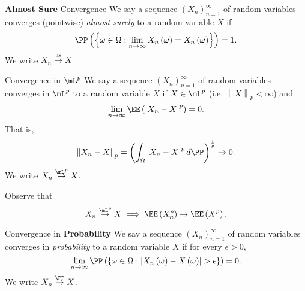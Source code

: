 \documentclass[stat901]{subfiles}
\begin{document}
    \begin{definition}{\textbf{Almost Sure} Convergence}
        We say a sequence $\left( X_{n} \right)^{\infty}_{n=1}$ of random variables converges (pointwise) \emph{almost surely} to a random variable $X$ if
        \begin{equation*}
            \PP\left( \left\lbrace \omega\in\Omega : \lim_{n\to\infty} X_n\left( \omega \right) = X_n\left( \omega \right) \right\rbrace \right) = 1.
        \end{equation*}
        We write $X_n\overset{\text{as}}{\to} X$.
    \end{definition}

    \begin{definition}{Convergence in $\mL^p$}
        We say a sequence $\left( X_{n} \right)^{\infty}_{n=1}$ of random variables converges in $\mL^p$ to a random variable $X$ if $X\in\mL^p$ (i.e. $\left\lVert X\right\rVert_p < \infty$) and
        \begin{equation*}
            \lim_{n\to\infty}\EE\left( \left| X_n-X \right|^p \right) = 0.
        \end{equation*}
        That is,
        \begin{equation*}
            \left\lVert X_n-X\right\rVert_p = \left(\int_{\Omega}\left| X_n-X \right|^pd\PP\right)^{\frac{1}{p}} \to 0.
        \end{equation*}
        We write $X_n\overset{\mL^p}{\to}X$.
    \end{definition}
    
    \np Observe that
    \begin{equation*}
        X_n\overset{\mL^p}{\to} X \implies \EE\left( X_n^p \right)\to \EE\left( X^p \right).
    \end{equation*}

    \clearpage

    \begin{definition}{Convergence in \textbf{Probability}}
        We say a sequence $\left( X_{n} \right)^{\infty}_{n=1}$ of random variables converges in \emph{probability} to a random variable $X$ if for every $\epsilon>0$,
        \begin{equation*}
            \lim_{n\to\infty} \PP\left( \left\lbrace \omega\in\Omega: \left| X_n\left( \omega \right)-X\left( \omega \right) \right|>\epsilon \right\rbrace \right) = 0.
        \end{equation*}
        We write $X_n\overset{\PP}{\to}X$.
    \end{definition}
\end{document}
